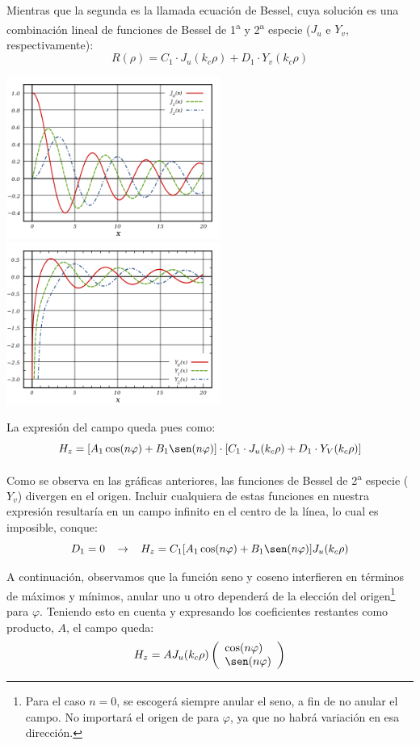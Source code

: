 \documentclass[12pt]{article}
\begin{document}
Mientras que la segunda es la llamada ecuaci\'on de Bessel, cuya soluci\'on es una combinaci\'on lineal de funciones de Bessel de 1\textsuperscript{a} y 2\textsuperscript{a} especie ($J_u$ e $Y_v$, respectivamente):
$$R(\rho) = C_1\cdot J_u(k_c\rho) + D_1\cdot Y_v(k_c\rho)$$
\begin{center}
	\includegraphics[width=7cm]{img/Bessel_de_primera_especie.png}\includegraphics[width=7cm]{img/Bessel_de_segunda_especie.png}
\end{center}

La expresi\'on del campo queda pues como:
$$H_z = [A_1\cos(n\varphi) +B_1\sen(n\varphi)]\cdot[C_1\cdot J_u(k_c\rho) + D_1\cdot Y_V(k_c\rho)]$$

Como se observa en las gr\'aficas anteriores, las funciones de Bessel de 2\textsuperscript{a} especie ($Y_v$) divergen en el origen. Incluir cualquiera de estas funciones en nuestra expresi\'on resultar\'ia en un campo infinito en el centro de la l\'inea, lo cual es imposible, conque:
$$D_1 = 0 \hspace{0.3cm}\rightarrow \hspace{0.3cm} H_z = C_1[A_1\cos(n\varphi) +B_1\sen(n\varphi)] J_u(k_c\rho)$$

A continuaci\'on, observamos que la funci\'on seno y coseno interfieren en t\'erminos de m\'aximos  y m\'inimos, anular uno u otro depender\'a de la elecci\'on del origen\footnote{Para el caso $n=0$, se escoger\'a siempre anular el seno, a fin de no anular el campo. No importar\'a el origen de para $\varphi$, ya que no habr\'a variaci\'on en esa direcci\'on.} para $\varphi$. Teniendo esto en cuenta y expresando los coeficientes restantes como producto, $A$, el campo queda:
$$H_z = A J_u(k_c\rho)\left( \begin{array}{l}
        \cos(n\varphi) \\
        \sen(n\varphi)\end{array} \right)$$
        
\end{document}
